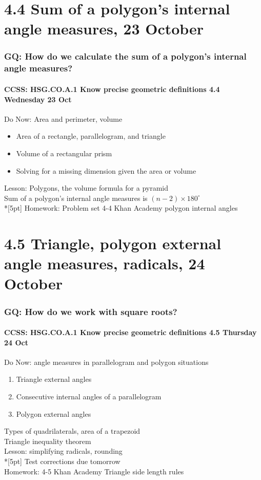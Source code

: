 \documentclass{beamer}
\begin{document}
  \section{4.4 Sum of a polygon's internal angle measures, 23 October}
  \frame
  {
    \frametitle{GQ: How do we calculate the sum of a polygon's internal angle measures?}
    \framesubtitle{CCSS: HSG.CO.A.1 Know precise geometric definitions \hfill \alert{4.4 Wednesday 23 Oct}}
  
    \begin{block}{Do Now: Area and perimeter, volume}
    \begin{itemize}
      \item Area of a rectangle, parallelogram, and triangle
      \item Volume of a rectangular prism
      \item Solving for a missing dimension given the area or volume
    \end{itemize}
    \end{block}
    Lesson: Polygons, the volume formula for a pyramid \\
    Sum of a polygon's internal angle measures is $(n-2) \times 180^\circ$ \\*[5pt]
    Homework: Problem set 4-4 Khan Academy polygon internal angles
  }

  \section{4.5 Triangle, polygon external angle measures, radicals, 24 October}
  \frame
  {
    \frametitle{GQ: How do we work with square roots?}
    \framesubtitle{CCSS: HSG.CO.A.1 Know precise geometric definitions \hfill \alert{4.5 Thursday 24 Oct}}
  
    \begin{block}{Do Now: angle measures in parallelogram and polygon situations}
    \begin{enumerate}
      \item Triangle external angles
      \item Consecutive internal angles of a parallelogram
      \item Polygon external angles
    \end{enumerate}
    \end{block}
    Types of quadrilaterals, area of a trapezoid \\
    Triangle inequality theorem \\
    Lesson: simplifying radicals, rounding \\*[5pt]
    Test corrections due \alert{tomorrow} \\
    Homework: 4-5 Khan Academy Triangle side length rules
  }
\end{document}
